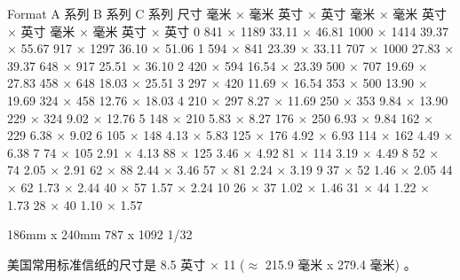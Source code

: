 \documentclass[main.tex]{subfiles}
\begin{document}
Format	A 系列	B 系列	C 系列
尺寸	毫米 × 毫米	英寸 × 英寸	毫米 × 毫米	英寸 × 英寸	毫米 × 毫米	英寸 × 英寸
0	841 × 1189	33.11 × 46.81	1000 × 1414	39.37 × 55.67	917 × 1297	36.10 × 51.06
1	594 × 841	23.39 × 33.11	707 × 1000	27.83 × 39.37	648 × 917	25.51 × 36.10
2	420 × 594	16.54 × 23.39	500 × 707	19.69 × 27.83	458 × 648	18.03 × 25.51
3	297 × 420	11.69 × 16.54	353 × 500	13.90 × 19.69	324 × 458	12.76 × 18.03
4	210 × 297	8.27 × 11.69	250 × 353	9.84 × 13.90	229 × 324	9.02 × 12.76
5	148 × 210	5.83 × 8.27	176 × 250	6.93 × 9.84	162 × 229	6.38 × 9.02
6	105 × 148	4.13 × 5.83	125 × 176	4.92 × 6.93	114 × 162	4.49 × 6.38
7	74 × 105	2.91 × 4.13	88 × 125	3.46 × 4.92	81 × 114	3.19 × 4.49
8	52 × 74	2.05 × 2.91	62 × 88	2.44 × 3.46	57 × 81	2.24 × 3.19
9	37 × 52	1.46 × 2.05	44 × 62	1.73 × 2.44	40 × 57	1.57 × 2.24
10	26 × 37	1.02 × 1.46	31 × 44	1.22 × 1.73	28 × 40	1.10 × 1.57


186mm x 240mm
787 x 1092 1/32 


美国常用标准信纸的尺寸是 8.5 英寸 × 11 ($\approx$ 215.9 毫米 x 279.4 毫米) 。
\newpage
\end{document}
